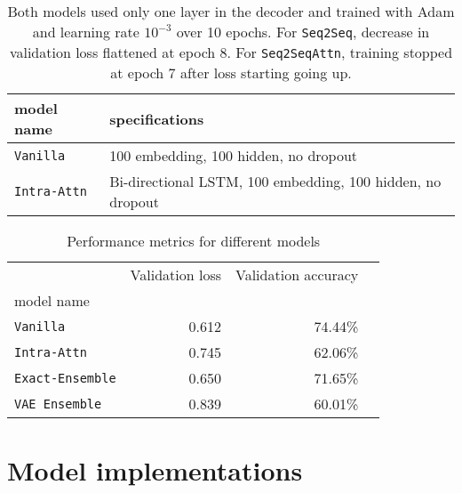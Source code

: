 \documentclass[12pt]{article}
\begin{document}
\begin{landscape}
\begin{table}[tb]
    
    \centering
\begin{tabular}{ll}
\toprule
model name                   &specifications\\
\midrule
\texttt{Vanilla} & 100 embedding, 100 hidden, no dropout\\
\texttt{Intra-Attn} & Bi-directional LSTM, 100 embedding, 100 hidden, no dropout\\
\bottomrule
\end{tabular}
    \caption{Both models used only one layer in the decoder and trained with Adam and learning rate $10^{-3}$ over 10 epochs. For \texttt{Seq2Seq}, decrease in validation loss flattened at epoch 8. For \texttt{Seq2SeqAttn}, training stopped at epoch 7 after loss starting going up.}
    \label{tab:spec}
\end{table}
\begin{table}[h]
\centering
\begin{tabular}{lrrr}
\toprule
{}                                     & Validation loss & Validation accuracy \\
model name                             &       &        & \\
\midrule
\texttt{Vanilla}                      & 0.612  & 74.44\% \\
\texttt{Intra-Attn}  & 0.745   & 62.06\% \\
\texttt{Exact-Ensemble}  & 0.650   & 71.65\% \\
\texttt{VAE Ensemble} & 0.839 & 60.01\% \\
\bottomrule
\end{tabular}
\caption{Performance metrics for different models}
\label{table:performance}
\end{table}
\end{landscape}




\appendix
\section{Model implementations}






\end{document}
